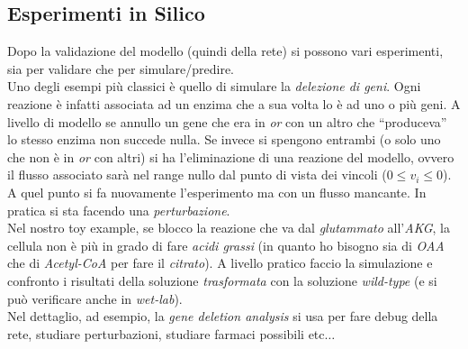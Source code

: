 \documentclass[a4paper,12pt, oneside]{book}
\begin{document}
\subsection{Esperimenti in Silico}
Dopo la validazione del modello (quindi della rete) si possono vari esperimenti,
sia per validare che per simulare/predire. \\
Uno degli esempi più classici è quello di simulare la \textit{delezione di
  geni}. Ogni reazione è infatti associata ad un enzima che a sua volta lo è ad
uno o più geni. A livello di modello se annullo un gene che era in \textit{or}
con un altro che ``produceva'' lo stesso enzima non succede nulla. Se invece si
spengono entrambi (o solo uno che non è in \textit{or} con altri) si ha
l'eliminazione di una reazione del modello, ovvero il flusso associato sarà nel
range nullo dal punto di vista dei vincoli ($0\leq v_i\leq 0$). A quel punto si
fa nuovamente l'esperimento ma con un flusso mancante. In pratica si sta facendo
una \textit{perturbazione}.\\
Nel nostro toy example, se blocco la reazione che va dal \textit{glutammato}
all'\textit{AKG}, la cellula non è più in grado di fare \textit{acidi grassi}
(in quanto 
ho bisogno sia di \textit{OAA} che di \textit{Acetyl-CoA} per fare il
\textit{citrato}). A livello pratico faccio la simulazione e confronto i
risultati della soluzione \textit{trasformata} con la soluzione
\textit{wild-type} (e si può verificare anche in \textit{wet-lab}).\\
Nel dettaglio, ad esempio, la \textit{gene deletion analysis} si usa per fare
debug della rete, studiare perturbazioni, studiare farmaci possibili
etc$\ldots$
\end{document}
